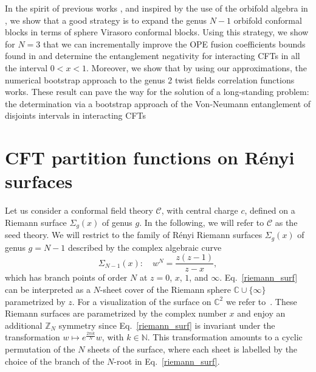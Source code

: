 \documentclass[a4paper,11pt]{article}
\begin{document}
In the spirit of previous works \cite{Rajabpour, Ruggiero}, and inspired by the use of the orbifold algebra in \cite{Dupic}, we show that a good strategy is to expand the genus $N-1$ orbifold conformal blocks in terms of sphere Virasoro conformal blocks.
Using this strategy, we show for $N=3$ that we can incrementally improve  the OPE fusion coefficients bounds found in \cite{Collier} and determine the entanglement negativity for interacting CFTs in all the interval $0<x<1$. Moreover, we show that by using  our approximations, the numerical bootstrap approach to the genus 2 twist fields correlation functions works. These result can pave the way for the solution of a long-standing problem: the determination via a bootstrap approach of the Von-Neumann entanglement of disjoints intervals in interacting CFTs
\section{CFT partition functions on R\'enyi surfaces}
Let us consider a conformal field theory $\mathcal{C}$, with central charge 
$c$, defined on a Riemann surface $\Sigma_g(x)$  of genus $g$. In the following, 
we will refer to $\mathcal{C}$ as the seed theory.  We will restrict to the 
family of R\'enyi Riemann surfaces $\Sigma_g(x)$ of genus $g=N-1$ described 
by the  complex algebraic curve
\begin{equation}\label{riemann_surf}
\Sigma_{N-1}(x): \quad  w^N=\frac{z(z-1)}{z-x},
\end{equation}
which has branch points of order $N$ at $z=0$, $x$, $1$, and $\infty$. 
Eq.~\eqref{riemann_surf} can be interpreted as a $N$-sheet cover of the Riemann sphere $\mathbb C\cup \{\infty\}$ parametrized by $z$. For a visualization of the surface on $\mathbb C^2$ we refer to~\cite{Dubrovin}. These Riemann surfaces are parametrized by  
the complex number $x$ and enjoy an additional $\mathbb{Z}_N$ symmetry since 
Eq.~\eqref{riemann_surf} is invariant under the transformation 
$w\mapsto e^{\frac{2\pi i k}{N}}w$, with $k\in\mathbb{N}$. 
This transformation amounts to a cyclic permutation of the $N$ sheets of the surface, where each sheet is labelled by the choice of the branch of the $N$-root in Eq.~\eqref{riemann_surf}. 
\end{document}
